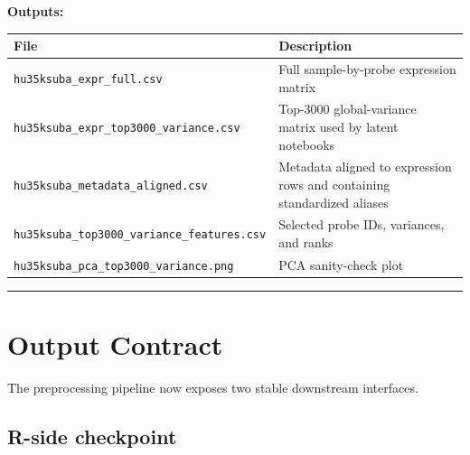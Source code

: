 \documentclass[
  letterpaper,
  DIV=11,
  numbers=noendperiod,
  openany,
  oneside]{scrreprt}
\begin{document}
\textbf{Outputs:}

\begin{longtable}[]{@{}
  >{\raggedright\arraybackslash}p{}
  >{\raggedright\arraybackslash}p{}@{}}
\toprule\noalign{}
\begin{minipage}[b]{\linewidth}\raggedright
File
\end{minipage} & \begin{minipage}[b]{\linewidth}\raggedright
Description
\end{minipage} \\
\midrule\noalign{}
\endhead
\bottomrule\noalign{}
\endlastfoot
\texttt{hu35ksuba\_expr\_full.csv} & Full sample-by-probe expression
matrix \\
\texttt{hu35ksuba\_expr\_top3000\_variance.csv} & Top-3000
global-variance matrix used by latent notebooks \\
\texttt{hu35ksuba\_metadata\_aligned.csv} & Metadata aligned to
expression rows and containing standardized aliases \\
\texttt{hu35ksuba\_top3000\_variance\_features.csv} & Selected probe
IDs, variances, and ranks \\
\texttt{hu35ksuba\_pca\_top3000\_variance.png} & PCA sanity-check
plot \\
\end{longtable}

\begin{center}\rule{0.5\linewidth}{0.5pt}\end{center}

\section*{Output Contract}\label{output-contract}


The preprocessing pipeline now exposes two stable downstream interfaces.

\subsection*{R-side checkpoint}\label{r-side-checkpoint}
\end{document}
